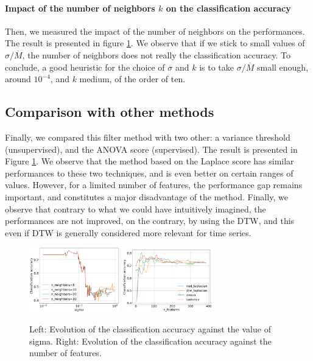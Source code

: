 \documentclass[11pt]{article}
\begin{document}
\paragraph{Impact of the number of neighbors $k$ on the classification accuracy}

Then, we measured the impact of the number of neighbors on the performances. The result is presented in figure \ref{fig:accuracy_vs_n_features}. We observe that if we stick to small values of $\sigma / \overline{M}$, the number of neighbors does not really the classification accuracy. To conclude, a good heuristic for the choice of $\sigma$ and $k$ is to take $\sigma / \overline{M}$ small enough, around $10^{-4}$, and $k$ medium, of the order of ten.

\subsection{Comparison with other methods}

Finally, we compared this filter method with two other: a variance threshold (unsupervised), and the ANOVA score (supervised). The result is presented in Figure \ref{fig:accuracy_vs_n_features}. We observe that the method based on the Laplace score has similar performances to these two techniques, and is even better on certain ranges of values. However, for a limited number of features, the performance gap remains important, and constitutes a major disadvantage of the method. Finally, we observe that contrary to what we could have intuitively imagined, the performances are not improved, on the contrary, by using the DTW, and this even if DTW is generally considered more relevant for time series. 

\begin{figure}
    \centering
    \includegraphics[width=0.35\textwidth]{figures/accuracy_vs_sigma_and_nnn.png}
    \includegraphics[width=0.35\textwidth]{figures/accuracy_vs_n_features.png}
    \caption{Left: Evolution of the classification accuracy against the value of sigma. Right: Evolution of the classification accuracy against the number of features.}
    \label{fig:accuracy_vs_n_features}
\end{figure}
\end{document}
